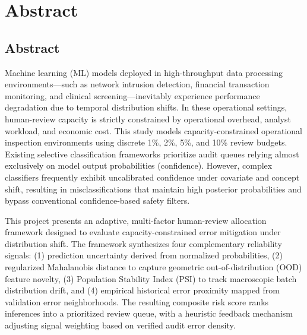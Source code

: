 \chapter{Abstract}

\section{Abstract}

Machine learning (ML) models deployed in high-throughput data processing environments---such as network intrusion detection, financial transaction monitoring, and clinical screening---inevitably experience performance degradation due to temporal distribution shifts. In these operational settings, human-review capacity is strictly constrained by operational overhead, analyst workload, and economic cost. This study models capacity-constrained operational inspection environments using discrete 1\%, 2\%, 5\%, and 10\% review budgets. Existing selective classification frameworks prioritize audit queues relying almost exclusively on model output probabilities (confidence). However, complex classifiers frequently exhibit uncalibrated confidence under covariate and concept shift, resulting in misclassifications that maintain high posterior probabilities and bypass conventional confidence-based safety filters.

This project presents an adaptive, multi-factor human-review allocation framework designed to evaluate capacity-constrained error mitigation under distribution shift. The framework synthesizes four complementary reliability signals: (1) prediction uncertainty derived from normalized probabilities, (2) regularized Mahalanobis distance to capture geometric out-of-distribution (OOD) feature novelty, (3) Population Stability Index (PSI) to track macroscopic batch distribution drift, and (4) empirical historical error proximity mapped from validation error neighborhoods. The resulting composite risk score ranks inferences into a prioritized review queue, with a heuristic feedback mechanism adjusting signal weighting based on verified audit error density.

